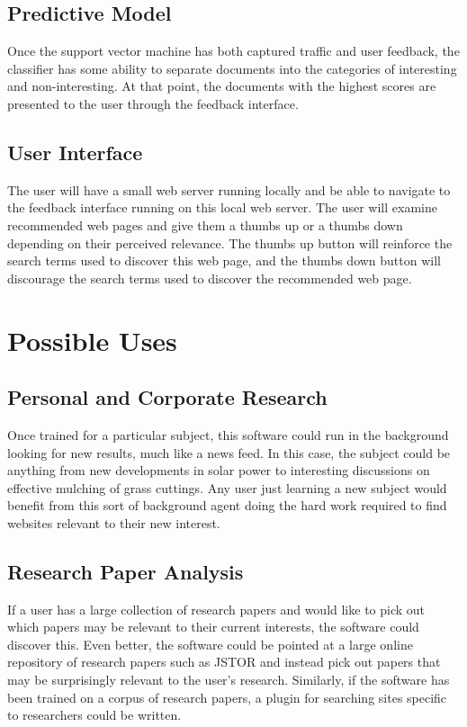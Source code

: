 \documentclass[12pt]{article}
\begin{document}
\subsection{Predictive Model}
Once the support vector machine has both captured traffic and user feedback, the classifier has some ability
to separate documents into the categories of interesting and non-interesting. At that point, the documents
with the highest scores are presented to the user through the feedback interface.
\subsection{User Interface}
The user will have a small web server running locally and be able to navigate to the feedback interface
running on this local web server. The user will examine recommended web pages and give them a thumbs up or a
thumbs down depending on their perceived relevance. The thumbs up button will reinforce the search terms used
to discover this web page, and the thumbs down button will discourage the search terms used to discover the
recommended web page.
\section{Possible Uses}
\subsection{Personal and Corporate Research}
Once trained for a particular subject, this software could run in the background looking for new results, much
like a news feed. In this case, the subject could be anything from new developments in solar power to
interesting discussions on effective mulching of grass cuttings. Any user just learning a new subject would
benefit from this sort of background agent doing the hard work required to find websites relevant to their new interest.
\subsection{Research Paper Analysis}
If a user has a large collection of research papers and would like to pick out which papers may be relevant to
their current interests, the software could discover this. Even better, the software could be pointed at a
large online repository of research papers such as JSTOR and instead pick out papers that may be surprisingly
relevant to the user's research. Similarly, if the software has been trained on a corpus of research papers,
a plugin for searching sites specific to researchers could be written.
\end{document}

